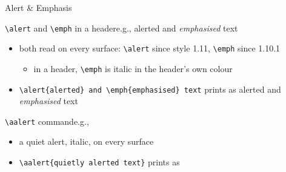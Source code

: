 \begin{frame}[c,fragile]{Alert \& Emphasis}
%
\begin{block}{\texttt{\textbackslash{}alert} and \texttt{\textbackslash{}emph} in a header\textemdash{}e.g., \alert{alerted} and \emph{emphasised} text}
\begin{itemize}
	\item both read on every surface: \texttt{\textbackslash{}alert} since style 1.11, \texttt{\textbackslash{}emph} since 1.10.1
	\begin{itemize}
		\item in a header, \texttt{\textbackslash{}emph} is italic in the header's own colour
	\end{itemize}
	\item[e.g.] \verb|\alert{alerted} and \emph{emphasised} text| prints as \alert{alerted} and \emph{emphasised} text
\end{itemize}
\end{block}
%
\begin{block}{\texttt{\textbackslash{}aalert} command\textemdash{}e.g., }
\begin{itemize}
	\item a quiet alert, italic, on every surface
	\item[e.g.] \verb|| prints as \aalert{quietly alerted text}
\end{itemize}
\end{block}
%
\end{frame}
